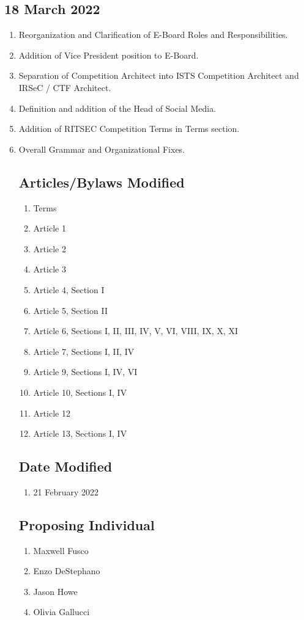 \subsection{18 March 2022}
\begin{enumerate}
      \item Reorganization and Clarification of E-Board Roles and Responsibilities.
      \item Addition of Vice President position to E-Board.
      \item Separation of Competition Architect into ISTS Competition Architect and IRSeC /
            CTF Architect.
      \item Definition and addition of the Head of Social Media.
      \item Addition of RITSEC Competition Terms in Terms section.
      \item Overall Grammar and Organizational Fixes.

            \subsection{Articles/Bylaws Modified}
            \begin{enumerate}
                  \item Terms
                  \item Article 1
                  \item Article 2
                  \item Article 3
                  \item Article 4, Section I
                  \item Article 5, Section II
                  \item Article 6, Sections I, II, III, IV, V, VI, VIII, IX, X, XI
                  \item Article 7, Sections I, II, IV
                  \item Article 9, Sections I, IV, VI
                  \item Article 10, Sections I, IV
                  \item Article 12
                  \item Article 13, Sections I, IV
            \end{enumerate}

            \subsection{Date Modified}
            \begin{enumerate}
                  \item 21 February 2022
            \end{enumerate}

            \subsection{Proposing Individual}
            \begin{enumerate}
                  \item Maxwell Fusco
                  \item Enzo DeStephano
                  \item Jason Howe
                  \item Olivia Gallucci
            \end{enumerate}
\end{enumerate}